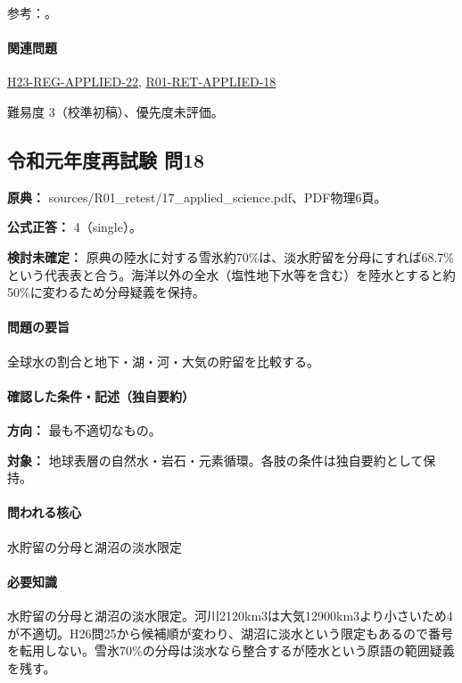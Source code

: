 \par 参考：\cite{gc_water}。

\paragraph{関連問題} \hyperref[q:h23-reg-applied-22]{H23-REG-APPLIED-22}, \hyperref[q:r01-ret-applied-18]{R01-RET-APPLIED-18}

\par 難易度 3（校準初稿）、優先度未評価。

\subsection{令和元年度再試験 問18}
\label{q:r01-ret-applied-18}

\noindent\textbf{原典：} sources/R01\_retest/17\_applied\_science.pdf、PDF物理6頁。

\textbf{公式正答：} 4（single）。

\par\textbf{検討未確定：} 原典の陸水に対する雪氷約70\%は、淡水貯留を分母にすれば68.7\%という代表表と合う。海洋以外の全水（塩性地下水等を含む）を陸水とすると約50\%に変わるため分母疑義を保持。

\paragraph{問題の要旨} 全球水の割合と地下・湖・河・大気の貯留を比較する。

\paragraph{確認した条件・記述（独自要約）}\mbox{}\par

\noindent\textbf{方向：} 最も不適切なもの。\par

\noindent\textbf{対象：} 地球表層の自然水・岩石・元素循環。各肢の条件は独自要約として保持。\par

\paragraph{問われる核心} 水貯留の分母と湖沼の淡水限定

\paragraph{必要知識} 水貯留の分母と湖沼の淡水限定。河川2120km3は大気12900km3より小さいため4が不適切。H26問25から候補順が変わり、湖沼に淡水という限定もあるので番号を転用しない。雪氷70\%の分母は淡水なら整合するが陸水という原語の範囲疑義を残す。

